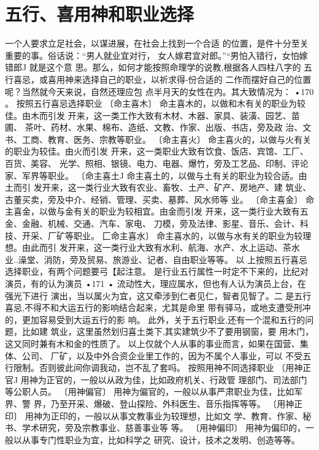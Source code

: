 \section{五行、喜用神和职业选择}
一个人要求立足社会，以谋进展，在社会上找到一个合适
的位置，是件十分至关重要的事。俗话说：“男人就业宜对行，
女人嫁君宜对郎。”“男怕入错行，女怕嫁错郎J 就是这个意
思。那么，如何才能按照命理学的说教,根据各人四柱八字的
五行喜忌，或喜用神来选择自己的职业，以祈求得-份合适的
二作而摆好自己的位置呢？当然就今天来说，自然还理应包
点半月天的女性在内。其大致情况为：
•170 。
按照五行喜忌选择职业
〔命主喜木〕
命主喜木的，以做和木有关的职业为较佳。由木而引发
开来，这一类工作大致有木材、木器、家具、装潢、园艺、苗圃、
茶叶、药材、水果、棉布、造纸、文教、作家、出版、书店，旁及政
治、文书、工商、教育、医务、宗教等职业。
〔命主喜火〕
命主喜火的，以做与火有关的职业为较佳。由火而引发
开来，这一类职业大致有饮食、饭店、宾馆、工厂、百货、美容、
光学、照相、银镜、电力、电器、爆竹，旁及工艺品、印制、评论
家、军界等职业。
〔命主喜土J
命主喜土的，以做与土有关的职业为较合适。由土而引
发开来，这一类行业大致有农业、畜牧、土产、矿产、房地产、建
筑业、古董买卖，旁及中介、经销、管理、买卖、墓葬、风水师等
业。
〔命主喜金〕
命主喜金，以做与金有关的职业为较相宜。由金而引发
开来，这一类行业大致有五金、金融、机械、交通、汽车、家电、
刀模，旁及法律、影星、音乐、会计、科技、开采、厂矿等职业。
匚命主喜水〕
命主喜水的，以做与水有关的职业为较理想。由此而引
发开来，这一类行业大致有水利、航海、水产、水上运动、茶水
业..澡堂、消防，旁及贸易、旅游业、记者、自由职业等等。
以 上按照五行喜忌选择职业，有两个问题要弓【起注意。
是行业五行属性一时定不下来的，比纪对演员，有的认为演员
•171 •
流动性大，理应属水，但也有人认为演员上台，在强光下进行
演出，当以属火为宜，这又牵涉到仁者见仁，智者见智了。二
是五行喜忌,不得不和大运五行的影响结合起来，尤其是命里
带有驿马，或地支遭受刑冲的，更加容易受到大运五行的影
响。
此外，关于五行职业,还有一个混和五行的问题，比如建
筑业，这里虽然划归喜土类下,其实建筑少不了要用钢窗，要
用木门，这又同时兼有木和金的性质了。
以上仅就个人从事的事业而言，如果在国营、集体、公司、
厂矿，以及中外合资企业里工作的，因为不属个人事业，可以
不受五行限制。否则彼此间你调我动，岂不乱了套吗。
按照用神不同选择职业
〔用神正官J
用神为正官的，一般以从政为佳，比如政府机关、行政管
理部门、司法部门等公职人员。
〔用神偏官〕
用神为偏官的，一般以从事严肃职业为佳，比如军界、警
界，乃至开采、爆破、登山探险、外科医生、音乐指挥等等。
〔用神正印〕
用神为正印的，一般以从事文教事业为较理想，比如文
学、教育、作家、秘书、学术研究，旁及宗教事业、慈善事业等
等。
〔用神偏印〕
用神为偏印的，一般以从事专门性职业为宜，比如科学之
研究、设计，技术之发明、创造等等。
